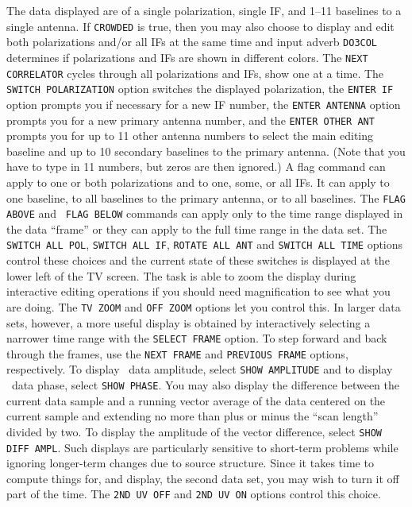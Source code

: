      The data displayed are of a single polarization, single IF, and
1--11 baselines to a single antenna.  If {\tt CROWDED} is true, then
you may also choose to display and edit both polarizations and/or all
IFs at the same time and input adverb {\tt DO3COL} determines if
polarizations and IFs are shown in different colors.  The {\tt NEXT
CORRELATOR} cycles through all polarizations and IFs, show one at a
time.  The {\tt SWITCH POLARIZATION} option switches the displayed
polarization, the {\tt ENTER IF} option prompts you if necessary for a
new IF number, the {\tt ENTER ANTENNA} option prompts you for a new
primary antenna number, and the {\tt ENTER OTHER ANT} prompts you for
up to 11 other antenna numbers to select the main editing baseline and
up to 10 secondary baselines to the primary antenna.  (Note that you
have to type in 11 numbers, but zeros are then ignored.)  A flag
command can apply to one or both polarizations and to one, some, or
all IFs.  It can apply to one baseline, to all baselines to the
primary antenna, or to all baselines.  The {\tt FLAG ABOVE} and {\tt
FLAG BELOW} commands can apply only to the time range displayed in the
data ``frame'' or they can apply to the full time range in the data
set.  The {\tt SWITCH ALL POL}, {\tt SWITCH ALL IF}, {\tt ROTATE ALL
ANT} and {\tt SWITCH ALL TIME} options control these choices and the
current state of these switches is displayed at the lower left of the
TV screen.  The task is able to zoom the display during interactive
editing operations if you should need magnification to see what you
are doing.  The {\tt TV ZOOM} and {\tt OFF ZOOM} options let you
control this.  In larger data sets, however, a more useful display is
obtained by interactively selecting a narrower time range with the
{\tt SELECT FRAME} option. To step forward and back through the
frames, use the {\tt NEXT FRAME} and {\tt PREVIOUS FRAME} options,
respectively.  To display \uv\ data amplitude, select {\tt SHOW
AMPLITUDE} and to display \uv\ data phase, select {\tt SHOW PHASE}\@.
You may also display the difference between the current data sample
and a running vector average of the data centered on the current
sample and extending no more than plus or minus the ``scan length''
divided by two.  To display the amplitude of the vector difference,
select {\tt SHOW DIFF AMPL}\@.  Such displays are particularly
sensitive to short-term problems while ignoring longer-term changes
due to source structure.  Since it takes time to compute things for,
and display, the second data set, you may wish to turn it off part of
the time. The {\tt 2ND UV OFF} and {\tt 2ND UV ON} options control
this choice.

